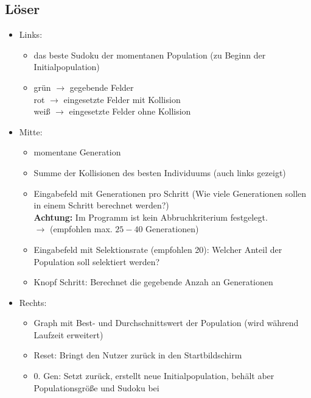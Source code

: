 \documentclass[fontsize=11pt, DIV=calc]{scrartcl} %
\begin{document}
    \subsection*{Löser}
    \begin{itemize}
        \item Links: 
        \begin{itemize}
            \item das beste Sudoku der momentanen Population (zu Beginn der Initialpopulation)
            \item grün \(\rightarrow\) gegebende Felder \\
            rot \(\rightarrow\) eingesetzte Felder mit Kollision \\
            weiß \(\rightarrow\) eingesetzte Felder ohne Kollision
        \end{itemize}
        \item Mitte:
        \begin{itemize}
            \item momentane Generation
            \item Summe der Kollisionen des besten Individuums (auch links gezeigt)
            \item Eingabefeld mit Generationen pro Schritt (Wie viele Generationen sollen in einem Schritt berechnet werden?)
            \\ \textbf{Achtung:} Im Programm ist kein Abbruchkriterium festgelegt.\\ \(\rightarrow\) (empfohlen max. \(25-40\) Generationen)
            \item Eingabefeld mit Selektionsrate (empfohlen 20): Welcher Anteil der Population soll selektiert werden?
            \item Knopf Schritt: Berechnet die gegebende Anzah an Generationen
        \end{itemize}
        \item Rechts:
        \begin{itemize}
            \item Graph mit Best- und Durchschnittswert der Population (wird während Laufzeit erweitert)
            \item Reset: Bringt den Nutzer zurück in den Startbildschirm
            \item 0. Gen: Setzt zurück, erstellt neue Initialpopulation, behält aber Populationsgröße und Sudoku bei
        \end{itemize}
    \end{itemize}
    

\end{document}

